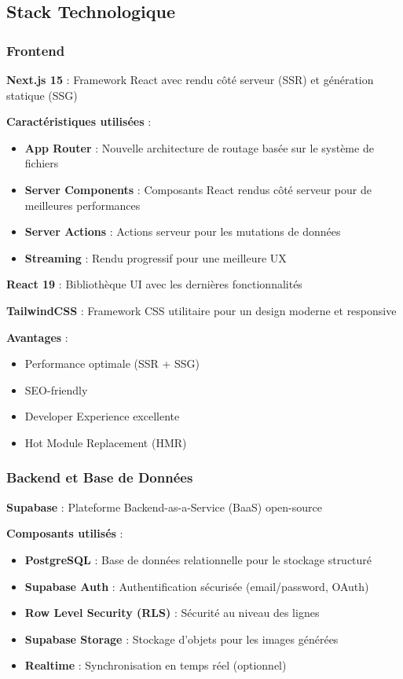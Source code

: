 \subsection{Stack Technologique}

\subsubsection{Frontend}

\textbf{Next.js 15} : Framework React avec rendu côté serveur (SSR) et génération statique (SSG)

\textbf{Caractéristiques utilisées} :
\begin{itemize}[leftmargin=*]
    \item \textbf{App Router} : Nouvelle architecture de routage basée sur le système de fichiers
    \item \textbf{Server Components} : Composants React rendus côté serveur pour de meilleures performances
    \item \textbf{Server Actions} : Actions serveur pour les mutations de données
    \item \textbf{Streaming} : Rendu progressif pour une meilleure UX
\end{itemize}

\textbf{React 19} : Bibliothèque UI avec les dernières fonctionnalités

\textbf{TailwindCSS} : Framework CSS utilitaire pour un design moderne et responsive

\textbf{Avantages} :
\begin{itemize}[leftmargin=*]
    \item Performance optimale (SSR + SSG)
    \item SEO-friendly
    \item Developer Experience excellente
    \item Hot Module Replacement (HMR)
\end{itemize}

\subsubsection{Backend et Base de Données}

\textbf{Supabase} : Plateforme Backend-as-a-Service (BaaS) open-source

\textbf{Composants utilisés} :
\begin{itemize}[leftmargin=*]
    \item \textbf{PostgreSQL} : Base de données relationnelle pour le stockage structuré
    \item \textbf{Supabase Auth} : Authentification sécurisée (email/password, OAuth)
    \item \textbf{Row Level Security (RLS)} : Sécurité au niveau des lignes
    \item \textbf{Supabase Storage} : Stockage d'objets pour les images générées
    \item \textbf{Realtime} : Synchronisation en temps réel (optionnel)
\end{itemize}


